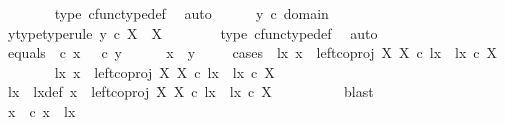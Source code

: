 \begin{isabellebody}
\ \ \ \ \ \ \isamarkupfalse%
\ {\isasymrho}{\isacharunderscore}{\kern0pt}type\ cfunc{\isacharunderscore}{\kern0pt}type{\isacharunderscore}{\kern0pt}def\ \isamarkupfalse%
\ auto\isanewline
\ \ \ \ \isamarkupfalse%
\ {\isachardoublequoteopen}y\ {\isasymin}\isactrlsub c\ domain\ {\isasymrho}{\isachardoublequoteclose}\ \isamarkupfalse%
\ \isamarkupfalse%
\ y{\isacharunderscore}{\kern0pt}type{\isacharbrackleft}{\kern0pt}type{\isacharunderscore}{\kern0pt}rule{\isacharbrackright}{\kern0pt}{\isacharcolon}{\kern0pt}\ {\isachardoublequoteopen}y\ {\isasymin}\isactrlsub c\ X\ {\isasymCoprod}\ X{\isachardoublequoteclose}\isanewline
\ \ \ \ \ \ \isamarkupfalse%
\ {\isasymrho}{\isacharunderscore}{\kern0pt}type\ cfunc{\isacharunderscore}{\kern0pt}type{\isacharunderscore}{\kern0pt}def\ \isamarkupfalse%
\ auto\isanewline
\ \ \ \ \isamarkupfalse%
\ equals{\isacharcolon}{\kern0pt}\ {\isachardoublequoteopen}{\isasymrho}\ {\isasymcirc}\isactrlsub c\ x\ {\isacharequal}{\kern0pt}\ {\isasymrho}\ {\isasymcirc}\isactrlsub c\ y{\isachardoublequoteclose}\isanewline
\ \ \ \ \isamarkupfalse%
\ {\isachardoublequoteopen}x\ {\isacharequal}{\kern0pt}\ y{\isachardoublequoteclose}\isanewline
\ \ \ \ \isamarkupfalse%
{\isacharparenleft}{\kern0pt}cases\ {\isachardoublequoteopen}{\isasymexists}\ lx{\isachardot}{\kern0pt}\ x\ {\isacharequal}{\kern0pt}\ left{\isacharunderscore}{\kern0pt}coproj\ X\ X\ {\isasymcirc}\isactrlsub c\ lx\ {\isasymand}\ lx\ {\isasymin}\isactrlsub c\ X{\isachardoublequoteclose}{\isacharparenright}{\kern0pt}\isanewline
\ \ \ \ \ \ \isamarkupfalse%
\ {\isachardoublequoteopen}{\isasymexists}lx{\isachardot}{\kern0pt}\ x\ {\isacharequal}{\kern0pt}\ left{\isacharunderscore}{\kern0pt}coproj\ X\ X\ {\isasymcirc}\isactrlsub c\ lx\ {\isasymand}\ lx\ {\isasymin}\isactrlsub c\ X{\isachardoublequoteclose}\isanewline
\ \ \ \ \ \ \isamarkupfalse%
\ \isamarkupfalse%
\ lx\ \ lx{\isacharunderscore}{\kern0pt}def{\isacharcolon}{\kern0pt}\ {\isachardoublequoteopen}x\ {\isacharequal}{\kern0pt}\ left{\isacharunderscore}{\kern0pt}coproj\ X\ X\ {\isasymcirc}\isactrlsub c\ lx\ {\isasymand}\ lx\ {\isasymin}\isactrlsub c\ X{\isachardoublequoteclose}\isanewline
\ \ \ \ \ \ \ \ \isamarkupfalse%
\ blast\isanewline
\ \ \ \ \ \ \isamarkupfalse%
\ {\isasymrho}x{\isacharcolon}{\kern0pt}\ {\isachardoublequoteopen}{\isasymrho}\ {\isasymcirc}\isactrlsub c\ x\ {\isacharequal}{\kern0pt}\ {\isasymlangle}lx{\isacharcomma}{\kern0pt}\ {\isasymt}{\isasymrangle}{\isachardoublequoteclose}\isanewline

\end{isabellebody}

